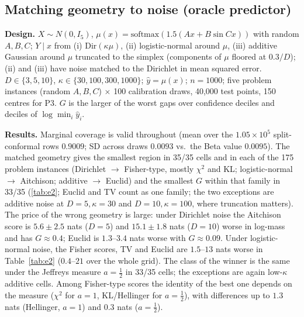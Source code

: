 \documentclass{article}
\theoremstyle{plain}
\theoremstyle{remark}
\newcommand{\yh}{\hat y}
\newcommand{\Dir}{\mathrm{Dir}}
\begin{document}
\subsection{Matching geometry to noise (oracle predictor)}\label{sec:e2}
\textbf{Design.} $X\sim N(0,I_5)$, $\mu(x)=\mathrm{softmax}(1.5(A x+B\sin Cx))$ with random $A,B,C$; $Y\mid x$ from (i) $\Dir(\kappa\mu)$, (ii) logistic-normal around $\mu$, (iii) additive Gaussian around $\mu$ truncated to the simplex (components of $\mu$ floored at $0.3/D$); (ii) and (iii) have noise matched to the Dirichlet in mean squared error. $D\in\{3,5,10\}$, $\kappa\in\{30,100,300,1000\}$; $\hat y=\mu(x)$; $n=1000$; five problem instances (random $A,B,C$) $\times$ 100 calibration draws, 40{,}000 test points, 150 centres for P3. $G$ is the larger of the worst gaps over confidence deciles and deciles of $\log\min_i\yh_i$.

\begin{table}[t]
\caption{Oracle predictor, split conformal, $n{=}1000$, $\alpha{=}0.1$. $G$: worst-slice gap (floor $\approx0.012$--$0.02$ from 40k test points); $\Delta\log$mass: mean log $M_1$ minus that of the best score in the same setting (nats). Mean $\pm$ 95\% $t$-interval over 5 problem instances; bold: smallest $G$ (within $0.0025$) / within $0.05$ nats of the best. Full grid: App.\ \cref{tab:e2fullG,tab:e2fulldlm}.}\label{tab:e2}
\centering\scriptsize
\resizebox{\columnwidth}{!}{}
\end{table}

\textbf{Results.} Marginal coverage is valid throughout (mean over the $1.05\times10^5$ split-conformal rows $0.9009$; SD across draws $0.0093$ vs.\ the Beta value $0.0095$). The matched geometry gives the smallest region in 35/35 cells and in each of the 175 problem instances (Dirichlet $\to$ Fisher-type, mostly $\chi^2$ and KL; logistic-normal $\to$ Aitchison; additive $\to$ Euclid) and the smallest $G$ within that family in 33/35 (\cref{tab:e2}; Euclid and TV count as one family; the two exceptions are additive noise at $D{=}5,\kappa{=}30$ and $D{=}10,\kappa{=}100$, where truncation matters). The price of the wrong geometry is large: under Dirichlet noise the Aitchison score is $5.6\pm2.5$ nats ($D{=}5$) and $15.1\pm1.8$ nats ($D{=}10$) worse in log-mass and has $G\approx0.4$; Euclid is $1.3$--$3.4$ nats worse with $G\approx0.09$. Under logistic-normal noise, the Fisher scores, TV and Euclid are $1.5$--$13$ nats worse in Table~\ref{tab:e2} ($0.4$--$21$ over the whole grid). The class of the winner is the same under the Jeffreys measure $a=\tfrac12$ in 33/35 cells; the exceptions are again low-$\kappa$ additive cells. Among Fisher-type scores the identity of the best one depends on the measure ($\chi^2$ for $a=1$, KL/Hellinger for $a=\tfrac12$), with differences up to $1.3$ nats (Hellinger, $a=1$) and $0.3$ nats ($a=\tfrac12$).
\end{document}
